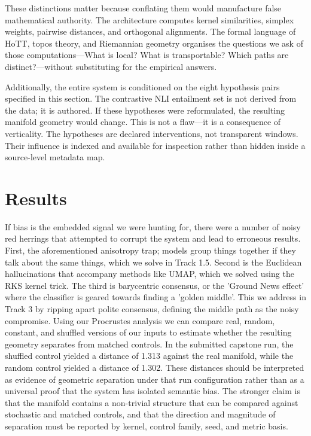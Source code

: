 These distinctions matter because conflating them would manufacture false mathematical authority. The architecture computes kernel similarities, simplex weights, pairwise distances, and orthogonal alignments. The formal language of HoTT, topos theory, and Riemannian geometry organises the questions we ask of those computations---What is local? What is transportable? Which paths are distinct?---without substituting for the empirical answers.

Additionally, the entire system is conditioned on the eight hypothesis pairs specified in this section. The contrastive NLI entailment set is not derived from the data; it is authored. If these hypotheses were reformulated, the resulting manifold geometry would change. This is not a flaw---it is a consequence of verticality. The hypotheses are declared interventions, not transparent windows. Their influence is indexed and available for inspection rather than hidden inside a source-level metadata map.


\section{Results}
If bias is the embedded signal we were hunting for, there were a number of noisy red
herrings that attempted to corrupt the system and lead to erroneous results. First, the
aforementioned anisotropy trap; models group things together if they talk about the same things,
which we solve in Track 1.5. Second is the Euclidean hallucinations that accompany methods
like UMAP, which we solved using the RKS kernel trick. The third is barycentric consensus, or
the 'Ground News effect' where the classifier is geared towards finding a 'golden middle'. This
we address in Track 3 by ripping apart polite consensus, defining the middle path as the noisy
compromise.
Using our Procrustes analysis we can compare real, random, constant,
and shuffled versions of our inputs to estimate whether the resulting geometry separates from
matched controls. In the submitted capstone run, the shuffled control yielded a distance of 1.313
against the real manifold, while the random control yielded a distance of 1.302. These distances
should be interpreted as evidence of geometric separation under that run configuration rather
than as a universal proof that the system has isolated semantic bias. The stronger claim is that
the manifold contains a non-trivial structure that can be compared against stochastic and
matched controls, and that the direction and magnitude of separation must be reported by kernel,
control family, seed, and metric basis.
